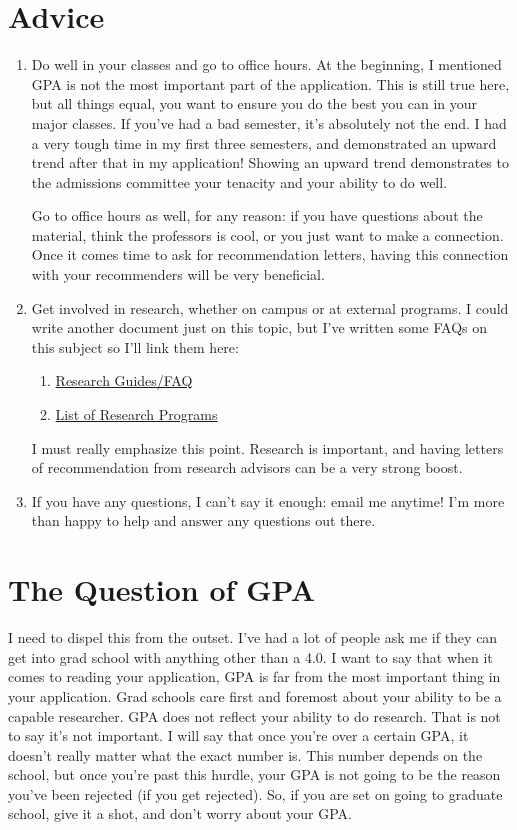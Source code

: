 \documentclass[12pt]{article}
\begin{document}
\section{Advice}
\begin{enumerate}
\item Do well in your classes and go to office hours. At the beginning, I mentioned GPA is not the most important part of the application. This is still true here, but all things equal, you want to ensure you do the best you can in your major classes. If you've had a bad semester, it's absolutely not the end. I had a very tough time in my first three semesters, and demonstrated an upward trend after that in my application! Showing an upward trend demonstrates to the admissions committee your tenacity and your ability to do well.

Go to office hours as well, for any reason: if you have questions about the material, think the professors is cool, or you just want to make a connection. Once it comes time to ask for recommendation letters, having this connection with your recommenders will be very beneficial.

\item Get involved in research, whether on campus or at external programs. I could write another document just on this topic, but I've written some FAQs on this subject so I'll link them here:
\begin{enumerate}
\item \href{https://spsyale.sites.yale.edu/research-guidefaq}{Research Guides/FAQ}
\item \href{https://spsyale.sites.yale.edu/resources}{List of Research Programs}
\end{enumerate}
I must really emphasize this point. Research is important, and having letters of recommendation from research advisors can be a very strong boost.

\item If you have any questions, I can't say it enough: email me anytime! I'm more than happy to help and answer any questions out there.
\end{enumerate}

\section{The Question of GPA}
I need to dispel this from the outset. I've had a lot of people ask me if they can get into grad school with anything other than a 4.0. I want to say that when it comes to reading your application, GPA is far from the most important thing in your application. Grad schools care first and foremost about your ability to be a capable researcher. GPA does not reflect your ability to do research. That is not to say it's not important. I will say that once you're over a certain GPA, it doesn't really matter what the exact number is. This number depends on the school, but once you're past this hurdle, your GPA is not going to be the reason you've been rejected (if you get rejected). So, if you are set on going to graduate school, give it a shot, and don't worry about your GPA.
\end{document}
